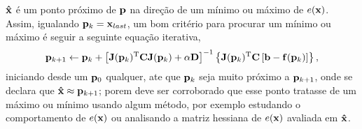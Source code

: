 \begin{myproofT}
$\VECTOR{\hat{x}}$
é um ponto próximo de $\VECTOR{p}$  na direção de um mínimo ou máximo de $ e(\VECTOR{x})$.
Assim, igualando $\VECTOR{p}_{k}=\VECTOR{x}_{last}$,  um bom critério para procurar um mínimo ou máximo é seguir a seguinte 
equação iterativa,
\begin{equation}\label{eq:proof:minfxbCfxbaxod3}
 \VECTOR{p}_{k+1} \leftarrow \VECTOR{p}_{k} +
\left[ \MATRIX{J}(\VECTOR{p}_{k})^{\transpose}\MATRIX{C} \MATRIX{J}(\VECTOR{p}_{k})+\alpha \MATRIX{D} \right]^{-1}
\left\{ \MATRIX{J}(\VECTOR{p}_{k})^{\transpose}\MATRIX{C} \left[\VECTOR{b}-\VECTOR{f}(\VECTOR{p}_{k})\right] \right\},
\end{equation}
iniciando desde um $\VECTOR{p}_{0}$ qualquer, ate que $\VECTOR{p}_{k}$ seja muito próximo a $\VECTOR{p}_{k+1}$,
onde se declara que $\VECTOR{\hat{x}} \approx \VECTOR{p}_{k+1}$; porem deve ser corroborado
que esse ponto tratasse de um máximo ou mínimo usando algum método, por exemplo estudando o comportamento 
de $e(\VECTOR{x})$ ou analisando a matriz hessiana de $e(\VECTOR{x})$ avaliada em $\VECTOR{\hat{x}}$.
\end{myproofT}
